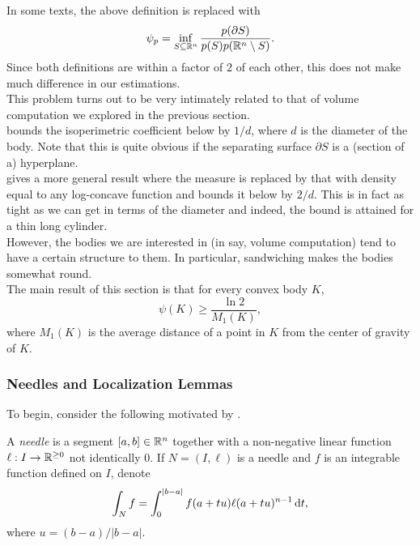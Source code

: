 In some texts, the above definition is replaced with
\[ \psi_p = \inf_{S\subseteq\mathbb{R}^n} \frac{p(\partial S)}{p(S)p(\mathbb{R}^n\setminus S)}. \]
Since both definitions are within a factor of $2$ of each other, this does not make much difference in our estimations.\\

This problem turns out to be very intimately related to that of volume computation we explored in the previous section.\\
\cite{lovasz-simonovits-mixing-rate-isoperimetric} bounds the isoperimetric coefficient below by $1/d$, where $d$ is the diameter of the body. Note that this is quite obvious if the separating surface $\partial S$ is a (section of a) hyperplane.\\
\cite{applegate-kannan-cube-sandwich} gives a more general result where the measure is replaced by that with density equal to any log-concave function and bounds it below by $2/d$. This is in fact as tight as we can get in terms of the diameter and indeed, the bound is attained for a thin long cylinder.\\
However, the bodies we are interested in (in say, volume computation) tend to have a certain structure to them. In particular, sandwiching makes the bodies somewhat round.\\
The main result of this section is that for every convex body $K$,
\[ \psi(K) \geq \frac{\ln 2}{M_1(K)}, \]
where $M_1(K)$ is the average distance of a point in $K$ from the center of gravity of $K$. 

\subsubsection{Needles and Localization Lemmas}
\label{sec: 5.1.2}

To begin, consider the following motivated by .

\begin{definition}
	A \textit{needle} is a segment $[a,b]\in\mathbb{R}^n$ together with a non-negative linear function $\ell:I\to\mathbb{R}^{\geq 0}$ not identically $0$. If $N=(I,\ell)$ is a needle and $f$ is an integrable function defined on $I$, denote
	\[ \int_N f = \int_{0}^{|b-a|} f(a+tu)\ell(a+tu)^{n-1} \operatorname{d}\!{t}, \]
	where $u=(b-a)/|b-a|$.
\end{definition}

